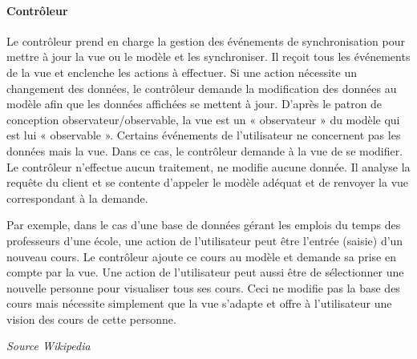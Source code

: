 \documentclass[a4paper,11pt,twoside]{report}
\begin{document}
  \paragraph*{Contrôleur}
  Le contrôleur prend en charge la gestion des événements de synchronisation pour mettre à jour la vue ou le modèle et les synchroniser. Il reçoit tous les événements de la vue et enclenche les actions à effectuer. Si une action nécessite un changement des données, le contrôleur demande la modification des données au modèle afin que les données affichées se mettent à jour. D'après le patron de conception observateur/observable, la vue est un « observateur » du modèle qui est lui « observable ». Certains événements de l'utilisateur ne concernent pas les données mais la vue. Dans ce cas, le contrôleur demande à la vue de se modifier. Le contrôleur n'effectue aucun traitement, ne modifie aucune donnée. Il analyse la requête du client et se contente d'appeler le modèle adéquat et de renvoyer la vue correspondant à la demande.

  Par exemple, dans le cas d'une base de données gérant les emplois du temps des professeurs d'une école, une action de l'utilisateur peut être l'entrée (saisie) d'un nouveau cours. Le contrôleur ajoute ce cours au modèle et demande sa prise en compte par la vue. Une action de l'utilisateur peut aussi être de sélectionner une nouvelle personne pour visualiser tous ses cours. Ceci ne modifie pas la base des cours mais nécessite simplement que la vue s'adapte et offre à l'utilisateur une vision des cours de cette personne.
  
  \flushright\footnotesize\textit{Source Wikipedia}
  
\listoffigures
\thispagestyle{\chead{}}
\end{document}
